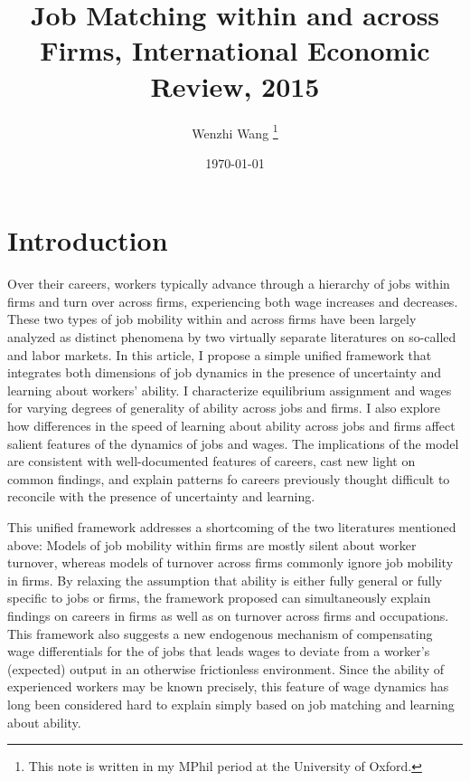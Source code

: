 \documentclass[12pt]{article}
\newcommand{\highlightB}[1]{{\emph{\color{MyBlue}{#1}}}}
\newcommand{\highlightP}[1]{{\emph{\color{MyPink}{#1}}}}
\theoremstyle{definition}
\begin{document}

\title{\bf Job Matching within and across Firms, International Economic Review, 2015}
\author{Wenzhi Wang \thanks{This note is written in my MPhil period at the University of Oxford.} } 
\date{\today}
\maketitle

\citet{pastorinoJobMatchingFirms2015}

\section{Introduction}

Over their careers, workers typically advance through a hierarchy of jobs within firms and turn over across firms, experiencing both wage increases and decreases. These two types of job mobility within and across firms have been largely analyzed as distinct phenomena by two virtually separate literatures on so-called \highlightB{internal} and \highlightB{external} labor markets. In this article, I propose a simple unified framework that integrates both dimensions of job dynamics in the presence of uncertainty and learning about workers' ability. I characterize equilibrium assignment and wages for varying degrees of generality of ability across jobs and firms. I also explore how differences in the speed of learning about ability across jobs and firms affect salient features of the dynamics of jobs and wages. The implications of the model are consistent with well-documented features of careers, cast new light on common findings, and explain patterns fo careers previously thought difficult to reconcile with the presence of uncertainty and learning. 

This unified framework addresses a shortcoming of the two literatures mentioned above: Models of job mobility within firms are mostly silent about worker turnover, whereas models of turnover across firms commonly ignore job mobility in firms. By relaxing the assumption that ability is either fully general or fully specific to jobs or firms, the framework proposed can simultaneously explain findings on careers in firms as well as on turnover across firms and occupations. This framework also suggests a new endogenous mechanism of compensating wage differentials for the \highlightP{differential informativeness} of jobs that leads wages to deviate from a worker's (expected) output in an otherwise frictionless environment. \highlightP{This mechanism gives rise to discrete wage increases at promotion in a firm, and discrete wage changes upon turnover across firms, for workers with any level of experience.} Since the ability of experienced workers may be known precisely, this feature of wage dynamics has long been considered hard to explain simply based on job matching and learning about ability. 
\end{document}
